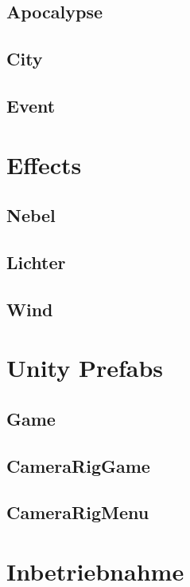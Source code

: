 \subsection{Apocalypse}\label{subsec:apocalypse-background-sound}

\subsection{City}\label{subsec:day-night-background-sound}

\subsection{Event}\label{subsec:building-collapse-sound}

\section{Effects}\label{sec:effects}

\subsection{Nebel}\label{subsec:fog-effect}

\subsection{Lichter}\label{subsec:light-effect}

\subsection{Wind}\label{subsec:wind-effect}

\section{Unity Prefabs}\label{sec:prefabs}
\subsection{Game}\label{subsec:game-prefab}
\subsection{CameraRigGame}\label{subsec:camera-rig-game-prefab}
\subsection{CameraRigMenu}\label{subsec:camera-rig-menu-prefab}
\section{Inbetriebnahme}\label{sec:commissioning}
